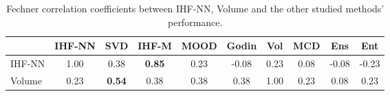 


\begin{table}[ht]
	\centering
	\caption{Fechner correlation coefficients between IHF-NN, Volume and the other studied methods' performance.}
		\begin{tabular}{lccccccccc}
			\toprule
			&  IHF-NN & SVD & IHF-M & MOOD & Godin & Vol & MCD & Ens & Ent \\
			\midrule
			IHF-NN           &  1.00 & 0.38 & \textbf{0.85} & 0.23 & -0.08 & 0.23 & 0.08 & -0.08 & -0.23 \\
			Volume          &   0.23 & \textbf{0.54} & 0.38 & 0.38 & 0.38 & 1.00 & 0.23 & 0.08 & 0.23  \\
			\bottomrule
	\end{tabular}%
	\label{tab:res_corr}
\end{table}
